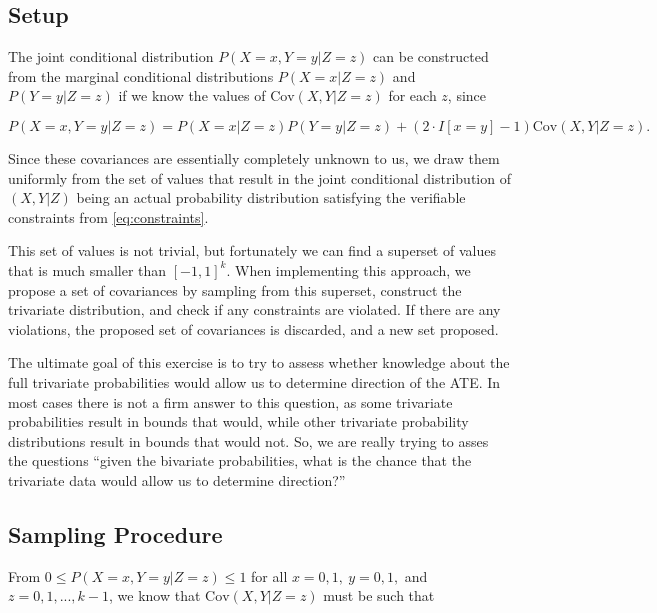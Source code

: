\documentclass[
]{article}
\theoremstyle{plain}
\begin{document}
\hypertarget{setup-1}{%
\subsection{Setup}\label{setup-1}}

The joint conditional distribution \(P(X = x, Y = y | Z = z)\) can be constructed from the marginal conditional distributions \(P(X = x | Z = z)\) and \(P(Y = y | Z = z)\) if we know the values of \(\text{Cov}(X, Y | Z = z)\) for each \(z\), since

\[
P(X = x, Y = y | Z = z) = P(X = x | Z = z)P(Y = y | Z = z) + (2\cdot I[x = y] - 1)\text{Cov}(X, Y | Z = z).
\]

Since these covariances are essentially completely unknown to us, we draw them uniformly from the set of values that result in the joint conditional distribution of \((X,Y|Z)\) being an actual probability distribution satisfying the verifiable constraints from \eqref{eq:constraints}.

This set of values is not trivial, but fortunately we can find a superset of values that is much smaller than \([-1,1]^k\). When implementing this approach, we propose a set of covariances by sampling from this superset, construct the trivariate distribution, and check if any constraints are violated. If there are any violations, the proposed set of covariances is discarded, and a new set proposed.

The ultimate goal of this exercise is to try to assess whether knowledge about the full trivariate probabilities would allow us to determine direction of the ATE. In most cases there is not a firm answer to this question, as some trivariate probabilities result in bounds that would, while other trivariate probability distributions result in bounds that would not. So, we are really trying to asses the questions ``given the bivariate probabilities, what is the chance that the trivariate data would allow us to determine direction?''

\hypertarget{sampling-procedure}{%
\subsection{Sampling Procedure}\label{sampling-procedure}}

From \(0 \le P(X = x, Y = y | Z = z) \le 1\) for all \(x = 0,1,\ y = 0,1,\) and \(z = 0, 1, ..., k-1\), we know that \(\text{Cov}(X, Y | Z = z)\) must be such that
\end{document}

